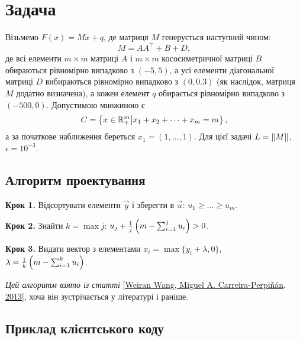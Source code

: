\section{Задача}

\begin{problem}
    Візьмемо $F(x) = M x + q$, де матриця $M$ генерується наступний чином:
    \begin{equation}
        M = A A^\intercal + B + D,
    \end{equation}
    де всі елементи $m \times m$ матриці $A$ і $m \times m$ кососиметричної матриці $B$ обираються рівномірно випадково з $(-5, 5)$, а усі елементи діагональної матриці $D$ вибираються рівномірно випадково з $(0, 0.3)$ (як наслідок, матриця $M$ додатно визначена), а кожен елемент $q$ обирається рівномірно випадково з $(-500, 0)$. Допустимою множиною є 
    \begin{equation}
        C = \left\{ x \in \mathbb{R}_+^m \middle| x_1 + x_2 + \dots + x_m = m \right\},
    \end{equation}
    а за початкове наближення береться $x_1 = (1, \dots, 1)$. Для цієї задачі $L = \left\| M \right\|$, $\epsilon = 10^{-3}$.
\end{problem}

\subsection{Алгоритм проектування}

\begin{algorithm}\nothing

    \textbf{Крок 1.} Відсортувати елементи $\vec y$ і зберегти в $\vec u$: $u_1 \ge \dots \ge u_m$. \medskip
        
    \textbf{Крок 2.} Знайти $k = \max j$: $u_j + \frac{1}{j} \left( m - \operatorname*{\sum}_{i = 1}^j u_i \right) > 0$. \medskip
        
    \textbf{Крок 3.} Видати вектор з елементами $x_i = \max\{y_i + \lambda, 0\}$, $\lambda = \frac{1}{k} \left( m - \operatorname*{\sum}_{i = 1}^k u_i \right)$.
\end{algorithm}

\emph{Цей алгоритм взято із статті} \href{https://arxiv.org/pdf/1309.1541v1.pdf}{[Weiran Wang, Miguel A. Carreira-Perpi\~n\'an, 2013]}, хоча він зустрічається у літературі і раніше.

\subsection{Приклад клієнтського коду}

